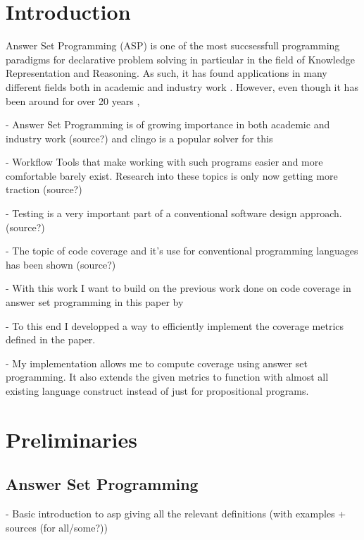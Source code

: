 \chapter{Introduction}
\label{ch:Introduction}
Answer Set Programming (ASP) is one of the most succsessfull programming paradigms for declarative problem solving in particular 
in the field of Knowledge Representation and Reasoning. As such, it has found applications in many different fields both in 
academic and industry work \cite{EGL16}. However, even though it has been around for over 20 years \cite{Nie99}, \cite{MT98} 

- Answer Set Programming is of growing importance in both academic and industry work (source?) and clingo is a popular solver for this

- Workflow Tools that make working with such programs easier and more comfortable barely exist. Research into these topics is only 
now getting more traction (source?)

- Testing is a very important part of a conventional software design approach.(source?)

- The topic of code coverage and it's use for conventional programming languages has been shown (source?)

- With this work I want to build on the previous work done on code coverage in answer set programming in this paper by \textcite{Jan+10}

- To this end I developped a way to efficiently implement the coverage metrics defined in the paper.

- My implementation allows me to compute coverage using answer set programming. It also extends the given metrics to function with
almost all existing language construct instead of just for propositional programs.


\chapter{Preliminaries}
\label{ch:Preliminaries}

\section{Answer Set Programming}
\label{sec:Preliminaries/Answer Set Programming}
- Basic introduction to asp giving all the relevant definitions (with examples + sources (for all/some?)) 
    
